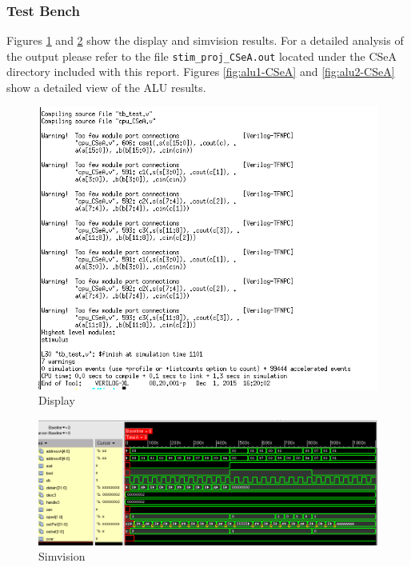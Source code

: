 \documentclass[12pt]{article}
\begin{document}
\subsubsection{Test Bench}
Figures \ref{fig:test-text-CSeA} and \ref{fig:test-test-CSeA} show the display and simvision results. For a detailed analysis of the output please refer to the file \texttt{stim\_proj\_CSeA.out} located under the CSeA directory included with this report. Figures  \ref{fig:alu1-CSeA} and \ref{fig:alu2-CSeA} show a detailed view of the ALU results.
\begin{figure}[H]
\centering
\includegraphics[width=.7\linewidth]{../CSeA/test-text}
\caption{Display}
\label{fig:test-text-CSeA}
\end{figure}
\begin{figure}[H]
\centering
\includegraphics[width=\linewidth]{../CSeA/test-test}
\caption{Simvision}
\label{fig:test-test-CSeA}
\end{figure}
\end{document}
